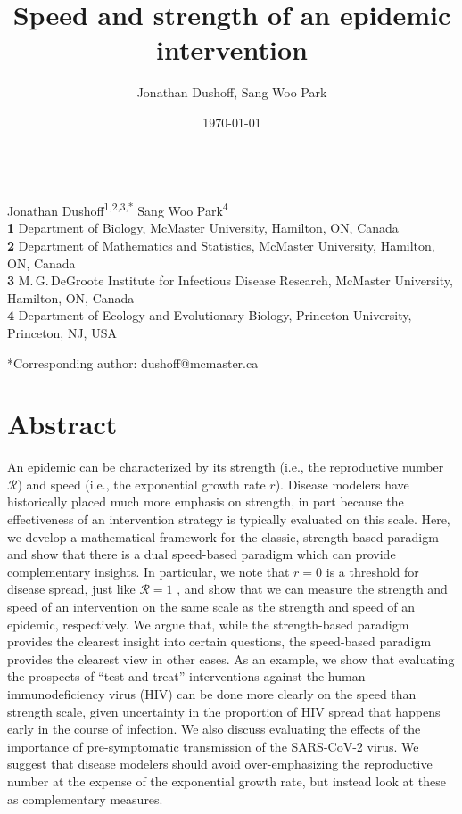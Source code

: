 \documentclass[12pt]{article}
\title{Speed and strength of an epidemic intervention}
\author{Jonathan Dushoff, Sang Woo Park}
\date{\today}
\newcommand{\RR}{\ensuremath{{\mathcal R}}}
\begin{document}
\begin{flushleft}{
	\Large
	\textbf{}
}
\newline
\\
Jonathan Dushoff\textsuperscript{1,2,3,*}
Sang Woo Park\textsuperscript{4}
\\
\bigskip
\textbf{1} Department of Biology, McMaster University, Hamilton, ON, Canada
\\
\textbf{2} Department of Mathematics and Statistics, McMaster University, Hamilton, ON, Canada
\\
\textbf{3} M.\,G.\,DeGroote Institute for Infectious Disease Research, McMaster University, Hamilton, ON, Canada
\\
\textbf{4} Department of Ecology and Evolutionary Biology, Princeton University, Princeton, NJ, USA
\\
\bigskip

*Corresponding author: dushoff@mcmaster.ca
\end{flushleft}

\section*{Abstract}

An epidemic can be characterized by its strength (i.e., the reproductive number \RR) and speed (i.e., the exponential growth rate $r$).
Disease modelers have historically placed much more emphasis on strength, in part because the effectiveness of an intervention strategy is typically evaluated on this scale.  
Here, we develop a mathematical framework for the classic, strength-based paradigm and show that there is a dual speed-based paradigm which can provide complementary insights.
In particular, we note that $r=0$ is a threshold for disease spread, just like $\RR=1$ \cite{dhmKermack}, and show that we can measure the strength and speed of an intervention on the same scale as the strength and speed of an epidemic, respectively.
We argue that, while the strength-based paradigm provides the clearest insight into certain questions, the speed-based paradigm provides the clearest view in other cases.
As an example, we show that evaluating the prospects of ``test-and-treat'' interventions against the human immunodeficiency virus (HIV) can be done more clearly on the speed than strength scale, given uncertainty in the proportion of HIV spread that happens early in the course of infection. 
We also discuss evaluating the effects of the importance of pre-symptomatic transmission of the SARS-CoV-2 virus.
We suggest that disease modelers should avoid over-emphasizing the reproductive number at the expense of the exponential growth rate, but instead look at these as complementary measures.
\end{document}
